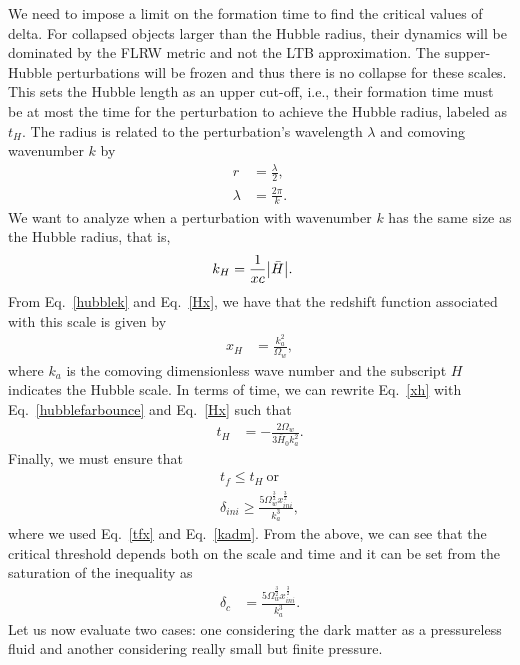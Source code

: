 \documentclass[a4paper,11pt]{article}
\begin{document}
We need to impose a limit on the formation time to find the critical values of delta. For collapsed objects larger than the Hubble radius, their dynamics will be dominated by the FLRW metric and not the LTB approximation. The supper-Hubble perturbations will be frozen and thus there is no collapse for these scales. This sets the Hubble length as an upper cut-off, i.e., their formation time must be at most the time for the perturbation to achieve the Hubble radius, labeled as $t_H$.  The radius is related to the perturbation's wavelength $\lambda$ and comoving wavenumber $k$ by~\cite{Quintin2016} 
\begin{align}
\label{radius}
r &=\frac{\lambda}{2},\\
\label{wavelength}
\lambda &= \frac{2 \pi}{k}.
\end{align}
We want to analyze when a perturbation with wavenumber $k$ has the same size as the Hubble radius, that is,
\begin{align}
\label{hubblek}
k_H &= \frac{1}{xc}\abs{\Bar{H}}
.\end{align}
From Eq.~\eqref{hubblek} and Eq.~\eqref{Hx}, we have that the redshift function associated with this scale is given by
\begin{align}
\label{xh}
    x_H &= \frac{k_a^2 }{\Omega_w}
,\end{align}
where $k_a$ is the comoving dimensionless wave number and the subscript $H$ indicates the Hubble scale. In terms of time, we can rewrite Eq.~\eqref{xh} with Eq.~\eqref{hubblefarbounce} and Eq.~\eqref{Hx} such that
\begin{align}
    t_H &= -\frac{2\Omega_w}{3 \bar{H}_0 k_a^2}
.\end{align}
Finally, we must ensure that
\begin{align}
\label{deltacf}
    t_f \leq t_H ~\text{or}\nonumber \\
    \delta_{ini} \geq \frac{5\Omega_w^{\frac{3}{2}} x_{ini}^{\frac{3}{2}}}{k_a^3}
,\end{align}
where we used Eq.~\eqref{tfx} and Eq.~\eqref{kadm}. From the above, we can see that the critical threshold depends both on the scale and time and it can be set from the saturation of the inequality as
\begin{align}
\label{deltacfinal}
\delta_c &=
\frac{5 \Omega_w^{\frac{3}{2}} x_{ini}^{\frac{3}{2}}}{k_a^3} 
.\end{align}
Let us now evaluate two cases: one considering the dark matter as a pressureless fluid and another considering really small but finite pressure.
\end{document}

